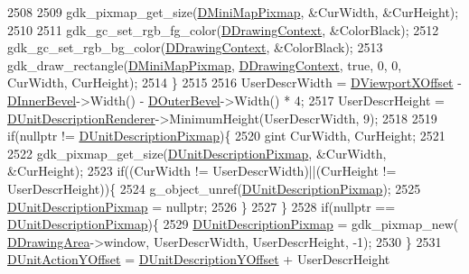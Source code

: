 \begin{DoxyCode}
{2508         
2509         gdk\_pixmap\_get\_size(\hyperlink{classCApplicationData_abe3af81659ead5113b7b2f165a88e737}{DMiniMapPixmap}, &CurWidth, &CurHeight);
2510 
2511         gdk\_gc\_set\_rgb\_fg\_color(\hyperlink{classCApplicationData_aa6c5bea9bdcc64398e5a3f693661d37c}{DDrawingContext}, &ColorBlack);
2512         gdk\_gc\_set\_rgb\_bg\_color(\hyperlink{classCApplicationData_aa6c5bea9bdcc64398e5a3f693661d37c}{DDrawingContext}, &ColorBlack);
2513         gdk\_draw\_rectangle(\hyperlink{classCApplicationData_abe3af81659ead5113b7b2f165a88e737}{DMiniMapPixmap}, \hyperlink{classCApplicationData_aa6c5bea9bdcc64398e5a3f693661d37c}{DDrawingContext}, \textcolor{keyword}{true}, 0, 0, 
      CurWidth, CurHeight);
2514     \}
2515     
2516     UserDescrWidth = \hyperlink{classCApplicationData_a306bba873ccc47126111305fe21ef3ff}{DViewportXOffset} - \hyperlink{classCApplicationData_a29a687c44dceb9e87a56d96612d59ab5}{DInnerBevel}->Width() - 
      \hyperlink{classCApplicationData_abc2b04aa05148da81145ff6d6bc2bf01}{DOuterBevel}->Width() * 4;
2517     UserDescrHeight = \hyperlink{classCApplicationData_a194301f34566fc497b032bdfcad55287}{DUnitDescriptionRenderer}->MinimumHeight(UserDescrWidth, 9);
2518     
2519     \textcolor{keywordflow}{if}(\textcolor{keyword}{nullptr} != \hyperlink{classCApplicationData_a52e5c1a2ac452c82580ba3f4978c3501}{DUnitDescriptionPixmap})\{
2520         gint CurWidth, CurHeight;
2521         
2522         gdk\_pixmap\_get\_size(\hyperlink{classCApplicationData_a52e5c1a2ac452c82580ba3f4978c3501}{DUnitDescriptionPixmap}, &CurWidth, &CurHeight);
2523         \textcolor{keywordflow}{if}((CurWidth != UserDescrWidth)||(CurHeight != UserDescrHeight))\{
2524             g\_object\_unref(\hyperlink{classCApplicationData_a52e5c1a2ac452c82580ba3f4978c3501}{DUnitDescriptionPixmap});
2525             \hyperlink{classCApplicationData_a52e5c1a2ac452c82580ba3f4978c3501}{DUnitDescriptionPixmap} = \textcolor{keyword}{nullptr};
2526         \}
2527     \}
2528     \textcolor{keywordflow}{if}(\textcolor{keyword}{nullptr} == \hyperlink{classCApplicationData_a52e5c1a2ac452c82580ba3f4978c3501}{DUnitDescriptionPixmap})\{
2529         \hyperlink{classCApplicationData_a52e5c1a2ac452c82580ba3f4978c3501}{DUnitDescriptionPixmap} = gdk\_pixmap\_new(
      \hyperlink{classCApplicationData_a4735f5d31632313e0b2a1659eb178987}{DDrawingArea}->window, UserDescrWidth, UserDescrHeight, -1);
2530     \}
2531     \hyperlink{classCApplicationData_a8ccfb55bd25cba0e6eb66573ba9c8b3c}{DUnitActionYOffset} = \hyperlink{classCApplicationData_a6c60b2da482699f1d998acfe24fec332}{DUnitDescriptionYOffset} + UserDescrHeight
}
\end{DoxyCode}
